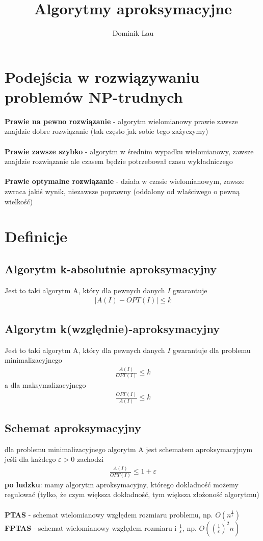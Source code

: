 \documentclass{article}
\title{Algorytmy aproksymacyjne}
\author{Dominik Lau}
\begin{document}
\maketitle

\section{Podejścia w rozwiązywaniu problemów NP-trudnych}
\textbf{Prawie na pewno rozwiązanie} - algorytm wielomianowy prawie zawsze znajdzie dobre rozwiązanie (tak często jak sobie tego zażyczymy) \\\\
\textbf{Prawie zawsze szybko} - algorytm w średnim wypadku wielomianowy,  zawsze znajdzie rozwiązanie
ale czasem będzie potrzebował czasu wykładniczego \\\\
\textbf{Prawie optymalne rozwiązanie} - działa w czasie wielomianowym, zawsze zwraca jakiś wynik, niezawsze 
poprawny (oddalony od właściwego o pewną wielkość)

\section{Definicje}
\subsection{Algorytm k-absolutnie aproksymacyjny}
Jest to taki algorytm A, który dla pewnych danych $I$ gwarantuje
\begin{gather*}
	|A(I) - OPT(I)| \leq k
\end{gather*}
\subsection{Algorytm k(względnie)-aproksymacyjny}
Jest to taki algorytm A, który dla pewnych danych $I$ gwarantuje dla problemu minimalizacyjnego
\begin{gather*}
	\frac{A(I)}{OPT(I)} \leq k
\end{gather*}
a dla maksymalizacyjnego
\begin{gather*}
	\frac{OPT(I)}{A(I)} \leq k
\end{gather*}

\subsection{Schemat aproksymacyjny}
dla problemu minimalizacyjnego algorytm A jest schematem aproksymacyjnym
jeśli dla każdego $\varepsilon > 0$ zachodzi
\begin{gather*}
	\frac{A(I)}{OPT(I)} \leq 1 + \varepsilon
\end{gather*}
\textbf{po ludzku}: mamy algorytm aproksymacyjny,  którego dokładność możemy regulować (tylko, że czym większa dokładność, tym większa złożoność algorytmu)\\\\
\textbf{PTAS} - schemat wielomianowy względem rozmiaru problemu,  np.  $O(n^{\frac{1}{\varepsilon}})$ \\
\textbf{FPTAS} - schemat wielomianowy względem rozmiaru  i $\frac{1}{\varepsilon}$, np. $O((\frac{1}{\varepsilon})^2n)$
\end{document}
